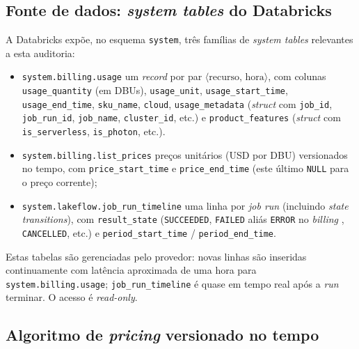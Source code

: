 \documentclass[12pt,a4paper,oneside]{article}
\begin{document}
\subsection{Fonte de dados: \textit{system tables} do Databricks}

A Databricks expõe, no esquema \texttt{system}, três famílias de
\textit{system tables} relevantes a esta auditoria:
\begin{itemize}\setlength{\itemsep}{2pt}
  \item \texttt{system.billing.usage} \textemdash{} um \textit{record}
        por par \(\langle\text{recurso, hora}\rangle\), com colunas
        \texttt{usage\_quantity} (em DBUs), \texttt{usage\_unit},
        \texttt{usage\_start\_time}, \texttt{usage\_end\_time},
        \texttt{sku\_name}, \texttt{cloud},
        \texttt{usage\_metadata} (\textit{struct} com
        \texttt{job\_id}, \texttt{job\_run\_id}, \texttt{job\_name},
        \texttt{cluster\_id}, etc.) e
        \texttt{product\_features} (\textit{struct} com
        \texttt{is\_serverless}, \texttt{is\_photon}, etc.).
  \item \texttt{system.billing.list\_prices} \textemdash{} preços
        unitários (USD por DBU) versionados no tempo, com
        \texttt{price\_start\_time} e \texttt{price\_end\_time}
        (este último \texttt{NULL} para o preço corrente);
  \item \texttt{system.lakeflow.job\_run\_timeline} \textemdash{}
        uma linha por \textit{job run} (incluindo \textit{state
        transitions}), com \texttt{result\_state}
        (\texttt{SUCCEEDED}, \texttt{FAILED} \textemdash{} aliás
        \texttt{ERROR} no \textit{billing} \textemdash{},
        \texttt{CANCELLED}, etc.) e \texttt{period\_start\_time} /
        \texttt{period\_end\_time}.
\end{itemize}

Estas tabelas são gerenciadas pelo provedor: novas linhas são
inseridas continuamente com latência aproximada de uma hora para
\texttt{system.billing.usage}; \texttt{job\_run\_timeline} é
quase em tempo real após a \textit{run} terminar. O acesso é
\textit{read-only}.

\subsection{Algoritmo de \textit{pricing} versionado no tempo}
\end{document}
